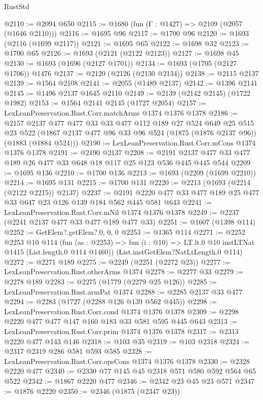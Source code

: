 \begin{lexlean}{RustStd}
\begin{coremodule}
@2110 := @2094 @650
@2115 := @1680 (fun (Γ : @1427) => @2109 (@2057 (@1646 @2110)))
@2116 := @1695 @96
@2117 := @1700 @96
@2120 := @1693 (@2116 (@1699 @2117))
@2121 := @1695 @65
@2122 := @1698 @32
@2123 := @1700 @65
@2126 := @1693 (@2121 (@2122 @2123))
@2127 := @1698 @45
@2130 := @1693 (@1696 (@2127 @1701))
@2134 := @1693 (@1705 (@2127 @1706)) @1476
@2137 := @2120 (@2126 (@2130 @2134))
@2138 := @2115 @2137
@2139 := @1564 @2108
@2141 := @2055 (@1489 @2137)
@2142 := @1396 @2141
@2145 := @1496 @2137 @1645 @2110
@2149 := @2139 (@2142 @2145) (@1722 @1982)
@2153 := @1564 @2141 @2145 (@1727 @2054)
@2157 := LexLeanPreservation.Rust.Corr.matchArms @1374 @1376 @1378
@2186 := @2157
    @2137
    @477
    @477
    @33
    @33
    @477
    @112
    @189
    @27
    @524
    @649
    @25
    @515
    @23
    @522
    (@1867 @2137 @477 @96 @33 @96 @524 (@1875 (@1876 @2137 @96)) (@1883 (@1884 @524)))
@2190 := LexLeanPreservation.Rust.Corr.mCons @1374 @1376 @1378
@2191 := @2190 @2137
@2208 := @2191 @2137 @477 @33 @477 @189 @26 @477 @33 @648 @18 @117 @25 @123 @536 @445 @445 @544
@2209 := @1695 @136
@2210 := @1700 @136
@2213 := @1693 (@2209 (@1699 @2210))
@2214 := @1695 @131
@2215 := @1700 @131
@2220 := @2213 (@1693 (@2214 (@2122 @2215)) @2137)
@2237 := @2191 @2220 @477 @33 @477 @189 @25 @477 @33 @647 @23 @126 @139 @184 @562 @445 @581 @643
@2241 := LexLeanPreservation.Rust.Corr.mNil @1374 @1376 @1378
@2249 := @2237 (@2241 @2137 @477 @33 @477 @189 @477 @33)
@2251 := @1607 (@1398 @114)
@2252 := GetElem?.getElem?.{0, 0, 0}
@2253 := @1365 @114
@2271 := @2252
    @2253
    @10
    @114
    (fun (as : @2253) =>
    fun (i : @10) => LT.lt.{0} @10 instLTNat @1415 (List.length.{0} @114 @1460))
    (List.instGetElem?NatLtLength.{0} @114)
@2272 := @2271 @189
@2275 := @2249 (@2251 (@2272 @23))
@2277 := LexLeanPreservation.Rust.otherArms @1374
@2278 := @2277 @33
@2279 := @2278 @189
@2283 := @2275 (@1779 (@2279 @25 @126))
@2285 := LexLeanPreservation.Rust.armPat @1374
@2288 := @2285 @2137 @33 @477
@2294 := @2283 (@1727 (@2288 @126 @139 @562 @445))
@2298 := LexLeanPreservation.Rust.Corr.cond @1374 @1376 @1378
@2309 := @2298 @2220 @477 @477 @147 @160 @183 @33 @581 @595 @445 @643
@2313 := LexLeanPreservation.Rust.Corr.prim @1374 @1376 @1378
@2317 := @2313 @2220 @477 @143 @146
@2318 := @103 @35
@2319 := @103 @2318
@2324 := @2317 @2319 @286 @581 @593 @585
@2328 := LexLeanPreservation.Rust.Corr.opsCons @1374 @1376 @1378
@2330 := @2328 @2220 @477
@2340 := @2330 @77 @145 @45 @2318 @571 @580 @592 @564 @65 @522
@2342 := @1867 @2220 @477
@2346 := @2342 @23 @45 @23 @571
@2347 := @1876 @2220
@2350 := @2346 (@1875 (@2347 @23))

\end{coremodule}
\end{lexlean}
